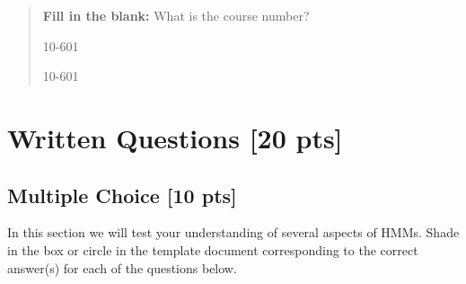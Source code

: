 \documentclass[11pt,addpoints,answers]{exam}
\numberwithin{equation}{section} %
\numberwithin{figure}{section} %
\numberwithin{table}{section} %
\begin{document}
\begin{quote}
\textbf{Fill in the blank:} What is the course number?

\begin{tcolorbox}[fit,height=1cm, width=4cm, blank, borderline={1pt}{-2pt},nobeforeafter]
    \begin{center}\huge10-601\end{center}
    \end{tcolorbox}\hspace{2cm}
    \begin{tcolorbox}[fit,height=1cm, width=4cm, blank, borderline={1pt}{-2pt},nobeforeafter]
    \begin{center}\huge10-601\end{center}
    \end{tcolorbox}
\end{quote}


\clearpage

\section{Written Questions [20 pts]}
\subsection{Multiple Choice [10 pts]}
In this section we will test your understanding of several aspects of HMMs.
%
Shade in the box or circle in the template document corresponding to the correct answer(s) for each of the questions below. 
\end{document}
